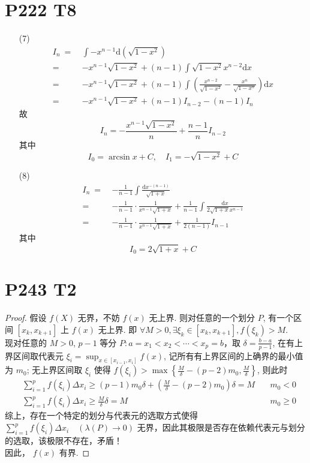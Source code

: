 \documentclass{article}
\newcommand{\dd}{\mathrm{d}}
\newcommand{\dx}{\dd x}
\begin{document}
\section*{P222 T8}

\begin{itemize}
    \item [(7)]
    \begin{align*}
        I_n\ =\ & \int -x^{n - 1}\dd\left(\sqrt{1 - x^2}\right) \\
        =\ & -x^{n - 1}\sqrt{1 - x^2} + (n - 1)\int \sqrt{1 - x^2}x^{n - 2} \dx \\
        =\ & -x^{n - 1}\sqrt{1 - x^2} + (n - 1)\int\left(\frac{x^{n - 2}}{\sqrt{1 - x^2}} - \frac{x^n}{\sqrt{1 - x^n}}\right)\dx \\
        =\ & -x^{n - 1}\sqrt{1 - x^2} + (n - 1)I_{n - 2} - (n - 1)I_n
    \end{align*}
    故
    \[
        I_n = -\frac{x^{n - 1}\sqrt{1 - x^2}}{n} + \frac{n - 1}{n}I_{n - 2}
    \]
    其中
    \[
        I_0 = \arcsin x + C, \quad I_1 = -\sqrt{1 - x^2} + C
    \]
    \item [(8)]
    \begin{align*}
        I_n\ =\ & -\frac{1}{n - 1} \int \frac{\dd x^{-(n - 1)}}{\sqrt{1 + x}} \\
        =\ & -\frac{1}{n - 1} \cdot \frac{1}{x^{n - 1}\sqrt{1 + x}} + \frac{1}{n - 1} \int \frac{\dx}{2\sqrt{1 + x}x^{n - 1}} \\
        =\ & -\frac{1}{n - 1} \cdot \frac{1}{x^{n - 1}\sqrt{1 + x}} + \frac{1}{2(n - 1)}I_{n - 1} 
    \end{align*}
    其中
    \[
        I_0 = 2\sqrt{1 + x} + C
    \]
\end{itemize}

\section*{P243 T2}

\begin{proof}
    假设 $f(X)$ 无界，不妨 $f(x)$ 无上界. 则对任意的一个划分 $P$, 有一个区间 $[x_k, x_{k + 1}]$ 上 $f(x)$ 无上界. 即 $\forall M > 0, \exists \xi_k \in [x_k, x_{k + 1}], f(\xi_k) > M$. \\
    现对任意的 $M > 0$, $p - 1$ 等分 $P: a = x_1 < x_2 < \cdots < x_p = b$，取 $\delta = \frac{b - a}{p - 1}$, 在有上界区间取代表元 $\xi_i = \sup_{x \in [x_{i - 1}, x_i]}f(x)$, 记所有有上界区间的上确界的最小值为 $m_0$; 无上界区间取 $\xi_i$ 使得 $f(\xi_i) > \max\left\{\frac{M}{\delta} - (p - 2)m_0,  \frac{M}{\delta}\right\}$, 则此时
    \begin{align*}
        & \sum_{i = 1}^{p}f(\xi_i)\Delta x_i \geqslant (p - 1)m_0\delta + \left(\frac{M}{\delta} - (p - 2)m_0\right)\delta = M &\quad m_0 < 0 \\
        & \sum_{i = 1}^{p}f(\xi_i)\Delta x_i \geqslant \frac{M}{\delta} \delta = M &\quad m_0 \geqslant 0
    \end{align*}
    综上，存在一个特定的划分与代表元的选取方式使得 $\sum_{i = 1}^{p}f(\xi_i)\Delta x_i \quad (\lambda(P) \to 0)$ 无界，因此其极限是否存在依赖代表元与划分的选取，该极限不存在，矛盾！\\
    因此， $f(x)$ 有界.
\end{proof}
\end{document}
